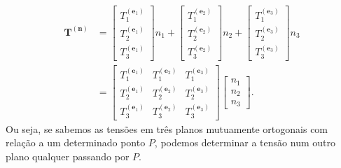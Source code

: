 \begin{align}\nonumber
\mathbf{T}^{(\mathbf{n})}&=
\begin{bmatrix}
T_1^{(\mathbf{e}_1)}\\
T_2^{(\mathbf{e}_1)}\\
T_3^{(\mathbf{e}_1)}
\end{bmatrix}
n_1+
\begin{bmatrix}
T_1^{(\mathbf{e}_2)}\\
T_2^{(\mathbf{e}_2)}\\
T_3^{(\mathbf{e}_2)}
\end{bmatrix}
n_2+
\begin{bmatrix}
T_1^{(\mathbf{e}_3)}\\
T_2^{(\mathbf{e}_3)}\\
T_3^{(\mathbf{e}_3)}
\end{bmatrix}
n_3\\\label{eq.matriz_tensao}
&=
\begin{bmatrix}
T_1^{(\mathbf{e}_1)}&T_1^{(\mathbf{e}_2)}&T_1^{(\mathbf{e}_3)}\\
T_2^{(\mathbf{e}_1)}&T_2^{(\mathbf{e}_2)}&T_2^{(\mathbf{e}_3)}\\
T_3^{(\mathbf{e}_1)}&T_3^{(\mathbf{e}_2)}&T_3^{(\mathbf{e}_3)}
\end{bmatrix}
\begin{bmatrix}
n_1\\
n_2\\
n_3
\end{bmatrix}.
\end{align}
Ou seja, se sabemos as tens\~oes em tr\^es planos mutuamente ortogonais com rela\c{c}\~ao a um determinado ponto $P$, podemos determinar a tens\~ao num outro plano qualquer passando por $P$.

